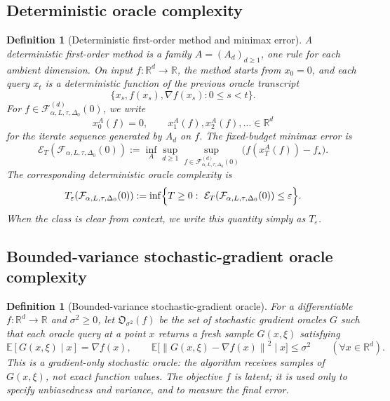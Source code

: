 \documentclass[11pt]{article}
\newtheorem{definition}[theorem]{Definition}
\newcommand{\R}{\mathbb{R}}
\newcommand{\E}{\mathbb{E}}
\newcommand{\norm}[1]{\left\lVert #1\right\rVert}
\begin{document}
\subsection{Deterministic oracle complexity}

\begin{definition}[Deterministic first-order method and minimax error]
\label{def:minimax}
A deterministic first-order method is a family \(A=(A_d)_{d\ge 1}\), one rule for each ambient dimension. On input
\(f:\R^d\to\R\), the method starts from \(x_0=0\), and each query \(x_t\) is a deterministic function of the previous
oracle transcript
\[
\bigl\{x_s,f(x_s),\nabla f(x_s):0\le s<t\bigr\}.
\]
For $f\in \mathcal F^{(d)}_{\alpha,L,\tau,\Delta_0}(0)$, we write
\[
x_0^A(f)=0,\qquad x_1^A(f),x_2^A(f),\ldots\in\R^d
\]
for the iterate sequence generated by $A_d$ on $f$.
The fixed-budget minimax error is
\[
\mathcal E_T\!\left(\mathcal F_{\alpha,L,\tau,\Delta_0}(0)\right)
:=
\inf_A\sup_{d\ge 1}\sup_{f\in\mathcal F^{(d)}_{\alpha,L,\tau,\Delta_0}(0)}
\bigl(f(x_T^A(f))-f_\star\bigr).
\]
The corresponding deterministic oracle complexity is
\[
T_\varepsilon\!\left(\mathcal F_{\alpha,L,\tau,\Delta_0}(0)\right)
:=
\inf\Bigl\{T\ge 0:\
\mathcal E_T\!\left(\mathcal F_{\alpha,L,\tau,\Delta_0}(0)\right)\le \varepsilon
\Bigr\}.
\]
When the class is clear from context, we write this quantity simply as \(T_\varepsilon\).
\end{definition}

\subsection{Bounded-variance stochastic-gradient oracle complexity}

\begin{definition}[Bounded-variance stochastic-gradient oracle]
\label{def:bv-oracle}
For a differentiable $f:\R^d\to\R$ and $\sigma^2\ge 0$, let $\mathfrak O_{\sigma^2}(f)$ be the set of stochastic
gradient oracles \(G\) such that each oracle query at a point \(x\) returns a fresh sample \(G(x,\xi)\) satisfying
\[
\E[G(x,\xi)\mid x]=\nabla f(x),
\qquad
\E\bigl[\norm{G(x,\xi)-\nabla f(x)}^2\mid x\bigr]\le \sigma^2
\qquad (\forall x\in\R^d).
\]
This is a gradient-only stochastic oracle: the algorithm receives samples of \(G(x,\xi)\), not exact function values.
The objective \(f\) is latent; it is used only to specify unbiasedness and variance, and to measure the final error.
\end{definition}
\end{document}
